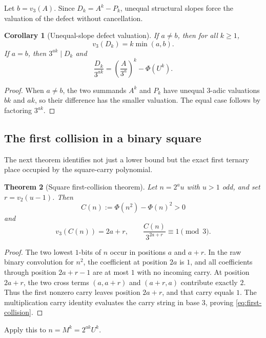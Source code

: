 \documentclass[11pt]{article}
\newtheorem{theorem}{Theorem}[section]
\newtheorem{corollary}[theorem]{Corollary}
\theoremstyle{definition}
\theoremstyle{remark}
\newcommand{\vTwo}{v_2}
\newcommand{\vThree}{v_3}
\newcommand{\PhiMap}{\Phi}
\begin{document}
Let $b=\vThree(A)$.  Since $D_k=A^k-P_k$, unequal structural slopes force the
valuation of the defect without cancellation.

\begin{corollary}[Unequal-slope defect valuation]\label{cor:D-valuation}
If $a\ne b$, then for all $k\ge1$,
\[
  \vThree(D_k)=k\min(a,b).
\]
If $a=b$, then $3^{ak}\mid D_k$ and
\[
  \frac{D_k}{3^{ak}}
  =\left(\frac{A}{3^a}\right)^k-\PhiMap(U^k).
\]
\end{corollary}

\begin{proof}
When $a\ne b$, the two summands $A^k$ and $P_k$ have unequal $3$-adic
valuations $bk$ and $ak$, so their difference has the smaller valuation.  The
equal case follows by factoring $3^{ak}$.
\end{proof}

\subsection{The first collision in a binary square}

The next theorem identifies not just a lower bound but the exact first ternary
place occupied by the square-carry polynomial.

\begin{theorem}[Square first-collision theorem]\label{thm:first-collision}
Let $n=2^au$ with $u>1$ odd, and set $r=\vTwo(u-1)$.  Then
\[
  C(n):=\PhiMap(n^2)-\PhiMap(n)^2>0
\]
and
\begin{equation}\label{eq:first-collision}
  \boxed{
  \vThree(C(n))=2a+r,
  \qquad
  \frac{C(n)}{3^{2a+r}}\equiv1\pmod3.}
\end{equation}
\end{theorem}

\begin{proof}
The two lowest $1$-bits of $n$ occur in positions $a$ and $a+r$.  In the raw
binary convolution for $n^2$, the coefficient at position $2a$ is $1$, and
all coefficients through position $2a+r-1$ are at most $1$ with no incoming
carry.  At position $2a+r$, the two cross terms
$(a,a+r)$ and $(a+r,a)$ contribute exactly $2$.  Thus the first nonzero carry
leaves position $2a+r$, and that carry equals $1$.  The multiplication carry
identity evaluates the carry string in base $3$, proving
\eqref{eq:first-collision}.
\end{proof}

Apply this to $n=M^k=2^{ak}U^k$.
\end{document}
